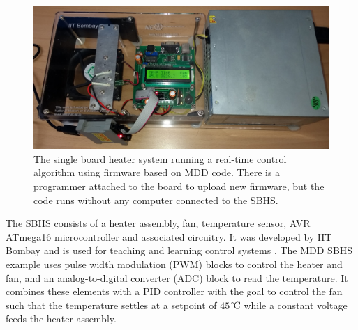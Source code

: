\documentclass{resources/modelica}
\begin{document}
\begin{figure}[htb]
  \centering
  \includegraphics[width=0.9\columnwidth]{figures/SBHS.jpg}
  \caption{The single board heater system running a real-time control algorithm using firmware based on MDD code. There is a programmer attached to the board to upload new firmware, but the code runs without any computer connected to the SBHS.}
  \label{fig:sbhs}
\end{figure}

\noindent
The SBHS consists of a heater assembly, fan, temperature sensor, AVR ATmega16 microcontroller and associated circuitry.
It was developed by IIT Bombay and is used for teaching and learning control systems \cite{Arora2010}.
The MDD SBHS example uses pulse width modulation (PWM) blocks to control the
heater and fan, and an analog-to-digital converter (ADC) block to read the
temperature. It combines these elements with a PID controller with the goal to
control the fan such that the temperature settles at a setpoint of $45\,$℃
while a constant voltage feeds the heater assembly.
\end{document}
